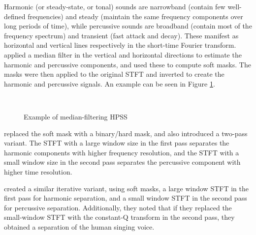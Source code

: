 \documentclass[10pt,letter]{article}
\begin{document}
Harmonic (or steady-state, or tonal) sounds are narrowband (contain few well-defined frequencies) and steady (maintain the same frequency components over long periods of time), while percussive sounds  are broadband (contain most of the frequency spectrum) and transient (fast attack and decay). These manifest as horizontal and vertical lines respectively in the short-time Fourier transform. \citet{fitzgerald1} applied a median filter in the vertical and horizontal directions to estimate the harmonic and percussive components, and used these to compute soft masks. The masks were then applied to the original STFT and inverted to create the harmonic and percussive signals. An example can be seen in Figure \ref{fig:fitz1}.

\begin{figure}[ht]
	\centering
	\vspace{-0.8em}
	\\
	\caption{Example of median-filtering HPSS}
	\label{fig:fitz1}
\end{figure}

\citet{driedger} replaced the soft mask with a binary/hard mask, and also introduced a two-pass variant. The STFT with a large window size in the first pass separates the harmonic components with higher frequency resolution, and the STFT with a small window size in the second pass separates the percussive component with higher time resolution.

\citet{fitzgerald2} created a similar iterative variant, using soft masks, a large window STFT in the first pass for harmonic separation, and a small window STFT in the second pass for percussive separation. Additionally, they noted that if they replaced the small-window STFT with the constant-Q transform in the second pass, they obtained a separation of the human singing voice.
\end{document}

